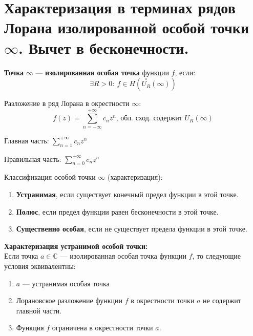 \newpage
\section{Характеризация в терминах рядов Лорана изолированной особой точки $\infty$. Вычет в бесконечности.}


\textbf{Точка }$\mathbf{\infty}$ --- \textbf{изолированная особая точка} функции $f$, если:
$$\exists R > 0: \ f\in H(\overset{\circ}{U_{R}}(\infty))$$

Разложение в ряд Лорана в окрестности $\infty$:
$$f(z)=\sum_{n=-\infty}^{+\infty} c_n z^n\text{, обл. сход. содержит } U_R(\infty)$$

Главная часть: $\sum_{n=1}^{+\infty} c_n z^n$

Правильная часть: $\sum_{n=0}^{-\infty} c_n z^n$

Классификация особой точки $\infty$ (характеризация):
\begin{enumerate}
    \item \textbf{Устранимая}, если существует конечный  предел функции в этой точке.
    \item \textbf{Полюс}, если предел функции равен бесконечности в этой точке.
    \item \textbf{Существенно особая}, если не существует предела функции в этой точке.
\end{enumerate}

\textbf{Характеризация устранимой особой точки:}\\
Если точка $a\in \mathbb{C}$ --- изолированная особая точка функции $f$, то следующие условия эквивалентны:
\begin{enumerate}
    \item $a$ --- устранимая особая точка
    \item Лорановское разложение функции $f$ в окрестности точки $a$ не содержит главной части. 
    \item Функция $f$ ограничена в окрестности точки $a$.
\end{enumerate}

